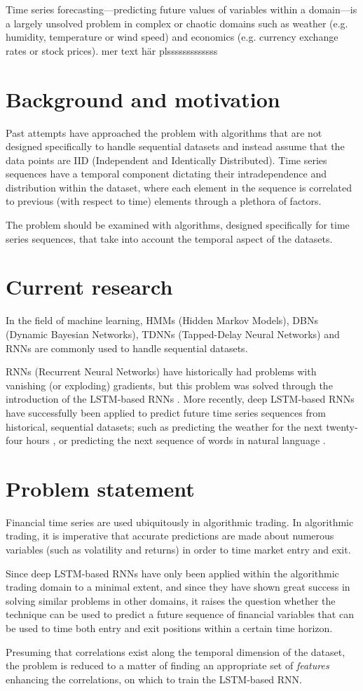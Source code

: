 Time series forecasting---predicting future values of variables within a domain---is a largely unsolved problem in complex or chaotic domains such as weather (e.g. humidity, temperature or wind speed) and economics (e.g. currency exchange rates or stock prices). mer text här plsssssssssssss

\section{Background and motivation}
Past attempts have approached the problem with algorithms that are not designed specifically to handle sequential datasets and instead assume that the data points are IID (Independent and Identically Distributed). Time series sequences have a temporal component dictating their intradependence and distribution within the dataset, where each element in the sequence is correlated to previous (with respect to time) elements through a plethora of factors.

The problem should be examined with algorithms, designed specifically for time series sequences, that take into account the temporal aspect of the datasets.

\section{Current research}
In the field of machine learning, HMMs (Hidden Markov Models), DBNs (Dynamic Bayesian Networks), TDNNs (Tapped-Delay Neural Networks) and RNNs are commonly used to handle sequential datasets.

RNNs (Recurrent Neural Networks) have historically had problems with vanishing (or exploding) gradients, but this problem was solved through the introduction of the LSTM-based RNNs \citep*{hochreiter1997}. More recently, deep LSTM-based RNNs have successfully been applied to predict future time series sequences from historical, sequential datasets; such as predicting the weather for the next twenty-four hours \citep*{zaytar2016}, or predicting the next sequence of words in natural language \citep*{quoc2014}.

\section{Problem statement}
Financial time series are used ubiquitously in algorithmic trading. In algorithmic trading, it is imperative that accurate predictions are made about numerous variables (such as volatility and returns) in order to time market entry and exit.

Since deep LSTM-based RNNs have only been applied within the algorithmic trading domain to a minimal extent, and since they have shown great success in solving similar problems in other domains, it raises the question whether the technique can be used to predict a future sequence of financial variables that can be used to time both entry and exit positions within a certain time horizon.

Presuming that correlations exist along the temporal dimension of the dataset, the problem is reduced to a matter of finding an appropriate set of \textit{features} enhancing the correlations, on which to train the LSTM-based RNN.
